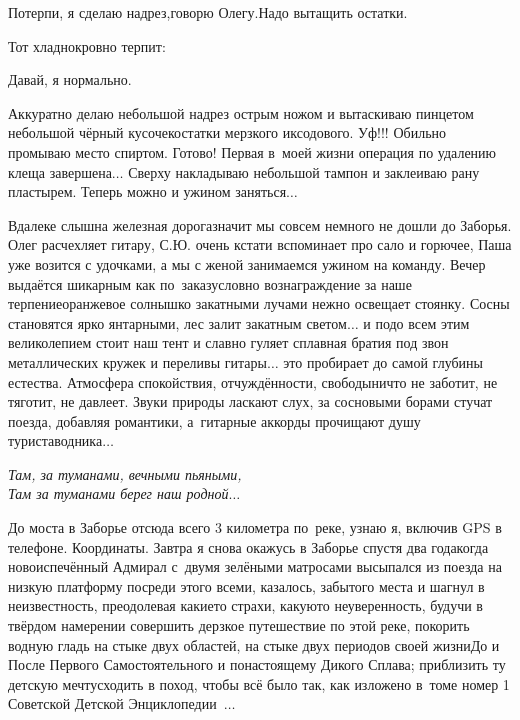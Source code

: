 \diagdash Потерпи, я сделаю надрез,\mdash говорю Олегу.\mdash Надо вытащить остатки.

Тот хладнокровно терпит:

\diagdash Давай, я нормально.
 
Аккуратно делаю небольшой надрез острым ножом и вытаскиваю пинцетом небольшой чёрный кусочек\mdash остатки мерзкого иксодового. Уф!!! Обильно промываю место спиртом. Готово! Первая в~моей жизни операция по удалению клеща завершена$\ldots$ Сверху накладываю небольшой тампон и заклеиваю рану пластырем. Теперь можно и ужином заняться$\ldots$

Вдалеке слышна железная дорога\mdash значит мы совсем немного не дошли до Заборья. Олег расчехляет гитару, С.Ю. очень кстати вспоминает про сало и горючее, Паша уже возится с удочками, а мы с женой занимаемся ужином на команду. Вечер выдаётся шикарным как по~заказу\mdash словно вознаграждение за наше терпение\mdash оранжевое солнышко закатными лучами нежно освещает стоянку. Сосны становятся ярко янтарными, лес залит закатным светом$\ldots$ и подо всем этим великолепием стоит наш тент и славно гуляет сплавная братия под звон металлических кружек и переливы гитары$\ldots$ это пробирает до самой глубины естества. Атмосфера спокойствия, отчуждённости, свободы\mdash ничто не заботит, не тяготит, не давлеет. Звуки природы ласкают слух, за сосновыми борами стучат поезда, добавляя романтики, а~гитарные аккорды прочищают душу туриста\sdash водника$\ldots$ 

\vspace{0.3cm}
\noindent\textit{%
	\hspace*{1.9cm}Там, за туманами, вечными пьяными,\\
	\hspace*{1.9cm}Там за туманами берег наш родной$\ldots$ 
}
\vspace{0.3cm}

До моста в Заборье отсюда всего 3 километра по~реке, узнаю я, включив GPS в телефоне. Координаты\mdash \CoordsLidSeventeenNearZaborie. Завтра я снова окажусь в Заборье спустя два года\mdash когда новоиспечённый Адмирал с~двумя зелёными матросами высыпался из поезда на низкую платформу посреди этого всеми, казалось, забытого места и шагнул в неизвестность, преодолевая какие\sdash то страхи, какую\sdash то неуверенность, будучи в твёрдом намерении совершить дерзкое путешествие по этой реке, покорить водную гладь на стыке двух областей, на стыке двух периодов своей жизни\mdash До и После Первого Самостоятельного и по\sdash настоящему Дикого Сплава; приблизить ту детскую мечту\mdash сходить в поход, чтобы всё было так, как изложено в~томе номер 1 Советской Детской Энциклопедии~\cite{ДетскаяЭнциклопедия}$\ldots$ 

